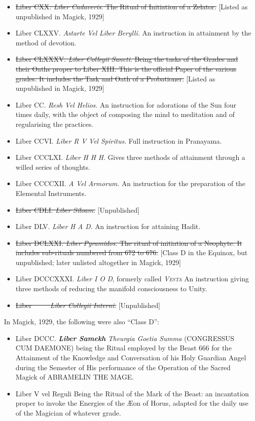 \begin{itemize}
\item \sout{Liber CXX. \textemdash{} \textit{Liber Cadaveris.} The Ritual of Initiation of a Zelator.} [Listed as unpublished in Magick, 1929]
\item Liber CLXXV. \textemdash{} \textit{Astarte Vel Liber Berylli.} An instruction in attainment by the method of devotion.
\item \sout{Liber CLXXXV. \textemdash{} \textit{Liber Collegii Sancti.} Being the tasks of the Grades and their Oaths proper to Liber XIII. This is the official Paper of the various grades. It includes the Task and Oath of a Probationer.} [Listed as unpublished in Magick, 1929]
\item Liber CC. \textemdash{} \textit{Resh Vel Helios.} An instruction for adorations of the Sun four times daily, with the object of composing the mind to meditation and of regularising the practices.
\item Liber CCVI. \textemdash{} \textit{Liber R V Vel Spiritus.} Full instruction in Pranayama.
\item Liber CCCLXI. \textemdash{} \textit{Liber H H H.} Gives three methods of attainment through a willed series of thoughts.
\item Liber CCCCXII. \textemdash{} \textit{A Vel Armorum.} An instruction for the preparation of the Elemental Instruments.
\item \sout{Liber CDLI. \textemdash{} \textit{Liber Siloam.}} [Unpublished]
\item Liber DLV. \textemdash{} \textit{Liber H A D.} An instruction for attaining Hadit.
\item \sout{Liber DCLXXI. \textemdash{} \textit{Liber Pyramidos.} The ritual of initiation of a Neophyte. It includes sub-rituals numbered from 672 to 676.} [Class D in the Equinox, but unpublished; later unlisted altogether in Magick, 1929]
\item Liber DCCCXXXI. \textemdash{} \textit{Liber I O D}, formerly called \textit{\textsc{Vesta}} An instruction giving three methods of reducing the manifold consciousness to Unity.
\item \sout{Liber \-\ \-\ \-\ \-\ \textemdash{} \textit{Liber Collegii Interni.}} [Unpublished]
\end{itemize}

In Magick, 1929, the following were also \enquote{Class D}:
\begin{itemize}
\item Liber DCCC. \textemdash{} \textit{\textbf{Liber Samekh} Theurgia Goetia Summa} (CONGRESSUS CUM DAEMONE) being the Ritual employed by the Beast 666 for the Attainment of the Knowledge and Conversation of his Holy Guardian Angel during the Semester of His performance of the Operation of the Sacred Magick of ABRAMELIN THE MAGE.
\item Liber V vel Reguli \textemdash{} Being the Ritual of the Mark of the Beast: an incantation proper to invoke the Energies of the \AE{}on of Horus, adapted for the daily use of the Magician of whatever grade.
\end{itemize}

